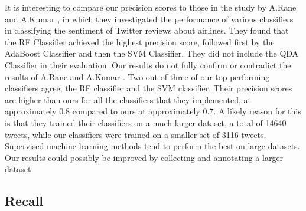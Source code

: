 It is interesting to compare our precision scores to those in the study by A.Rane and A.Kumar \cite{Rane2018}, in which they investigated the performance of various classifiers in classifying the sentiment of Twitter reviews about airlines. They found that the RF Classifier achieved the highest precision score, followed first by the AdaBoost Classifier and then the SVM Classifier. They did not include the QDA Classifier in their evaluation. Our results do not fully confirm or contradict the results of A.Rane and A.Kumar \cite{Rane2018}. Two out of three of our top performing classifiers agree, the RF classifier and the SVM classifier. Their precision scores are higher than ours for all the classifiers that they implemented, at approximately 0.8 compared to ours at approximately 0.7. A likely reason for this is that they trained their classifiers on a much larger dataset, a total of 14640 tweets, while our classifiers were trained on a smaller set of 3116 tweets. Supervised machine learning methods tend to perform the best on large datasets. Our results could possibly be improved by collecting and annotating a larger dataset.

\subsection{Recall}

